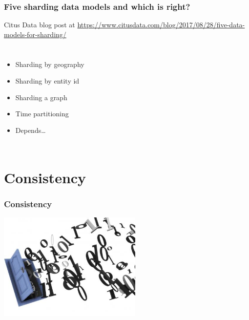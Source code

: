 \documentclass{beamer}
\begin{document}
{
  \begin{frame}
    \frametitle{Five sharding data models and which is right?}

    Citus Data blog post at \url{https://www.citusdata.com/blog/2017/08/28/five-data-models-for-sharding/}
    \vfill

    \begin{columns}[c]
      \begin{itemize}
      \item Sharding by geography
      \item Sharding by entity id
      \item Sharding a graph
      \item Time partitioning
      \item Depends…
      \end{itemize}
    \end{columns}

  \end{frame}
}

\section{Consistency}

\begin{frame}
  \frametitle{Consistency}

  \begin{center}
    \includegraphics[height=2.1in]{bits.jpeg}
  \end{center}
\end{frame}
\end{document}
